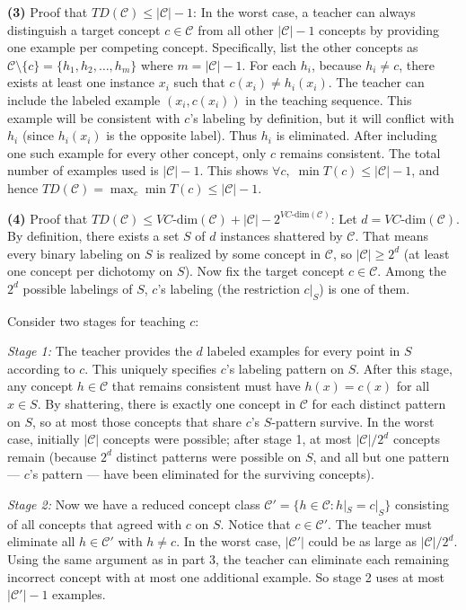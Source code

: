 \documentclass[11pt]{article}
\DeclareMathOperator{\1}{\mathbbm{1}}
\begin{document}
\textbf{(3)} Proof that $TD(\mathcal{C}) \le |\mathcal{C}| - 1$: In the worst case, a teacher can always distinguish a target concept $c \in \mathcal{C}$ from all other $|\mathcal{C}|-1$ concepts by providing one example per competing concept. Specifically, list the other concepts as $\mathcal{C} \setminus \{c\} = \{h_1, h_2, \dots, h_{m}\}$ where $m=|\mathcal{C}|-1$. For each $h_i$, because $h_i \neq c$, there exists at least one instance $x_i$ such that $c(x_i) \neq h_i(x_i)$. The teacher can include the labeled example $(x_i, c(x_i))$ in the teaching sequence. This example will be consistent with $c$’s labeling by definition, but it will conflict with $h_i$ (since $h_i(x_i)$ is the opposite label). Thus $h_i$ is eliminated. After including one such example for every other concept, only $c$ remains consistent. The total number of examples used is $|\mathcal{C}|-1$. This shows $\forall c,\; \min T(c) \le |\mathcal{C}|-1$, and hence $TD(\mathcal{C}) = \max_{c}\min T(c) \le |\mathcal{C}|-1$.

\textbf{(4)} Proof that $TD(\mathcal{C}) \le VC\text{-dim}(\mathcal{C}) + |\mathcal{C}| - 2^{VC\text{-dim}(\mathcal{C})}$: Let $d = VC\text{-dim}(\mathcal{C})$. By definition, there exists a set $S$ of $d$ instances shattered by $\mathcal{C}$. That means every binary labeling on $S$ is realized by some concept in $\mathcal{C}$, so $|\mathcal{C}| \ge 2^d$ (at least one concept per dichotomy on $S$). Now fix the target concept $c \in \mathcal{C}$. Among the $2^d$ possible labelings of $S$, $c$’s labeling (the restriction $c|_S$) is one of them. 

Consider two stages for teaching $c$:

\textit{Stage 1:} The teacher provides the $d$ labeled examples for every point in $S$ according to $c$. This uniquely specifies $c$’s labeling pattern on $S$. After this stage, any concept $h \in \mathcal{C}$ that remains consistent must have $h(x) = c(x)$ for all $x \in S$. By shattering, there is exactly one concept in $\mathcal{C}$ for each distinct pattern on $S$, so at most those concepts that share $c$’s $S$-pattern survive. In the worst case, initially $|\mathcal{C}|$ concepts were possible; after stage 1, at most $|\mathcal{C}|/2^d$ concepts remain (because $2^d$ distinct patterns were possible on $S$, and all but one pattern — $c$’s pattern — have been eliminated for the surviving concepts).

\textit{Stage 2:} Now we have a reduced concept class $\mathcal{C}' = \{h \in \mathcal{C}: h|_S = c|_S\}$ consisting of all concepts that agreed with $c$ on $S$. Notice that $c \in \mathcal{C}'$. The teacher must eliminate all $h \in \mathcal{C}'$ with $h \neq c$. In the worst case, $|\mathcal{C}'|$ could be as large as $|\mathcal{C}|/2^d$. Using the same argument as in part 3, the teacher can eliminate each remaining incorrect concept with at most one additional example. So stage 2 uses at most $|\mathcal{C}'|-1$ examples.
\end{document}
